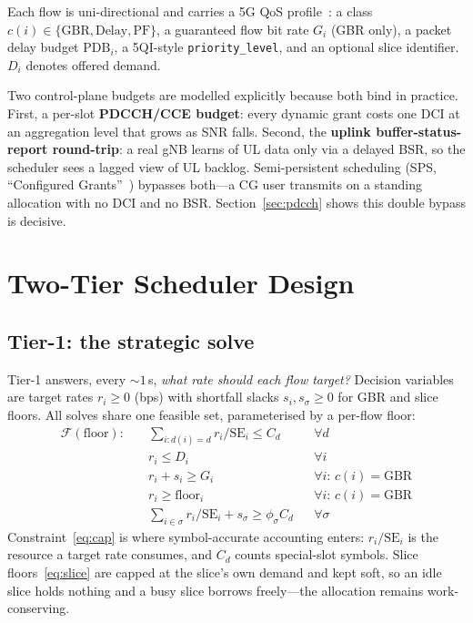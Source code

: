 \documentclass[conference]{IEEEtran}
\begin{document}
Each flow is uni-directional and carries a 5G QoS profile~\cite{ts23501}:
a class
$c(i)\in\{\mathrm{GBR},\mathrm{Delay},\mathrm{PF}\}$, a guaranteed flow
bit rate $G_i$ (GBR only), a packet delay budget $\mathrm{PDB}_i$, a
5QI-style \texttt{priority\_level}, and an optional slice identifier.
$D_i$ denotes offered demand.

Two control-plane budgets are modelled explicitly because both bind in
practice. First, a per-slot \textbf{PDCCH/CCE budget}: every dynamic grant
costs one DCI at an aggregation level that grows as SNR falls. Second, the
\textbf{uplink buffer-status-report round-trip}: a real gNB learns of UL
data only via a delayed BSR, so the scheduler sees a lagged view of UL
backlog. Semi-persistent scheduling (SPS, ``Configured
Grants''~\cite{ts38321}) bypasses both---a CG user transmits on a standing allocation with no DCI and no BSR.
Section~\ref{sec:pdcch} shows this double bypass is decisive.

\section{Two-Tier Scheduler Design}\label{sec:design}

\subsection{Tier-1: the strategic solve}

Tier-1 answers, every ${\sim}1$\,s, \emph{what rate should each flow
target?} Decision variables are target rates $r_i \ge 0$ (bps) with
shortfall slacks $s_i, s_\sigma \ge 0$ for GBR and slice floors. All solves
share one feasible set, parameterised by a per-flow floor:
\begin{align}
\mathcal{F}(\mathrm{floor}):\quad
&\textstyle\sum_{i: d(i)=d} r_i/\mathrm{SE}_i \le C_d && \forall d \label{eq:cap}\\
&r_i \le D_i && \forall i \label{eq:dem}\\
&r_i + s_i \ge G_i && \forall i{:}\, c(i){=}\mathrm{GBR} \label{eq:gbr}\\
&r_i \ge \mathrm{floor}_i && \forall i{:}\, c(i){=}\mathrm{GBR} \label{eq:hard}\\
&\textstyle\sum_{i\in\sigma} r_i/\mathrm{SE}_i + s_\sigma \ge \phi_\sigma C_d
  && \forall \sigma \label{eq:slice}
\end{align}
Constraint~\eqref{eq:cap} is where symbol-accurate accounting enters:
$r_i/\mathrm{SE}_i$ is the resource a target rate consumes, and $C_d$
counts special-slot symbols. Slice floors~\eqref{eq:slice} are capped at
the slice's own demand and kept soft, so an idle slice holds nothing and a
busy slice borrows freely---the allocation remains work-conserving.
\end{document}
